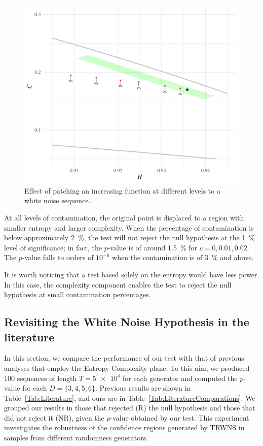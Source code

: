 \documentclass[alpha-refs]{wiley-article}
\begin{document}
\begin{figure}[hbt]
	\centering
	\includegraphics[width=.7\linewidth]{Figures/PointsPatchedIncreasingFunction}
	\caption{Effect of patching an increasing function at different levels to a white noise sequence.}\label{Fig:PointsPatchedIncreasingFunction}
\end{figure}

At all levels of contamination, the original point is displaced to a region with smaller entropy and larger complexity.
When the percentage of contamination is below approximately \SI{2}{\percent}, the test will not reject the null hypothesis at the \SI{1}{\percent} level of significance; in fact, the $p$-value is of around \SI{1.5}{\percent} for $c=0,0.01,0.02$.
The $p$-value falls to orders of $10^{-6}$ when the contamination is of \SI{3}{\percent} and above.

It is worth noticing that a test based solely on the entropy would have less power.
In this case, the complexity component enables the test to reject the null hypothesis at small contamination percentages.

\subsection{Revisiting the White Noise Hypothesis in the literature}

In this section, we compare the performance of our test with that of 
previous analyses that employ the Entropy-Complexity plane.
To this aim, we produced $100$ sequences of length $T = \num[scientific-notation=true]{5 e4}$ for each generator and computed the $p$-value for each $D = \{3, 4, 5, 6\}$.
Previous results are shown in Table~\ref{Tab:Literature}, and ours are in Table~\ref{Tab:LiteratureComparations}.
We grouped our results in those that rejected (R) the null hypothesis and those that did not reject it (NR), given the $p$-value obtained by our test. 
This experiment investigates the robustness of the confidence regions generated by TRWNS in samples from different randomness generators.
\end{document}
